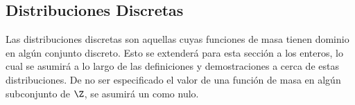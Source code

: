 \subsection{Distribuciones Discretas}
Las distribuciones discretas son aquellas cuyas funciones de masa tienen
dominio en algún conjunto discreto. Esto se extenderá para esta
sección a los enteros, lo cual se asumirá a lo largo de
las definiciones y demostraciones a cerca de estas distribuciones.
De no ser especificado el valor de una función de masa en algún
subconjunto de $\Z$, se asumirá un como nulo.





\clearpage